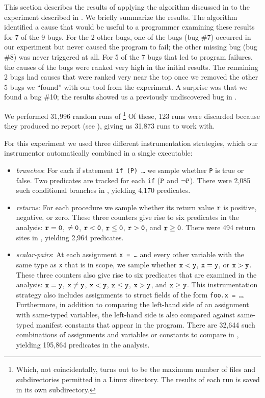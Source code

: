 
This section describes the results of applying the algorithm discussed
in  to the experiment described in
.  We briefly summarize the results.  
The algorithm identified a cause that would be useful to a programmer
examining these results for 7 of the 9 bugs.  For the 2 other bugs,
one of the bugs (bug \#7) occurred in our experiment but never caused
the program to fail; the other missing bug (bug \#8) was never
triggered at all.  For 5 of the 7 bugs that led to program failures,
the causes of the bugs were ranked very high in the initial results.  The
remaining 2 bugs had causes that were ranked very near the top once
we removed the other 5 bugs we ``found'' with our tool from the
experiment.  A surprise was that we found a bug \#10; the results
showed us a previously undiscovered bug in \moss.

We performed 31,996 random runs of
\moss\footnote{Which, not coincidentally, turns out to be the maximum
number of files and subdirectories permitted in a Linux directory.
The results of each run is saved in its own subdirectory.}  Of these,
123 runs were discarded because they produced no report (see ),
giving us 31,873 runs to work with.  

For this experiment we used three different instrumentation strategies, which our
instrumentor automatically combined in a single executable:
\begin{itemize}
\item {\em branches}: For each if statement {\tt if (P) \ldots} we sample whether {\tt P} is true or false.
Two predicates are tracked for each {\tt if} ($\tt P$ and $\tt \neg P$).  There were 2,085 such conditional branches
in \moss, yielding 4,170 predicates.

\item {\em returns}: For each procedure we sample whether its return value $\tt r$ is positive, negative, or zero.
These three counters give rise to six predicates in the analysis: $\tt r = 0$, $\tt \neq 0$, $\tt r < 0$, $\tt r \leq 0$, $\tt r > 0$, and $\tt r \geq 0$.
There were 494 return sites in \moss, yielding 2,964 predicates.

\item {\em scalar-pairs}: At each assignment {\tt x = \ldots} and every other variable with the same type as {\tt x} that is in scope,
we sample whether $\tt x < y$, $\tt x = y$, or $\tt x > y$.  These
three counters also give rise to six predicates that are examined in
the analysis: $\tt x = y$, $\tt x \neq y$, $\tt x < y$, $\tt x \leq
y$, $\tt x > y$, and $\tt x \geq y$.  This instrumentation strategy 
also includes assignments to struct fields of the form {\tt foo.x =
\ldots}.  Furthermore, in addition to comparing the left-hand side of
an assignment with same-typed variables, the left-hand side is also compared against
same-typed manifest constants that appear in the program.  There are
32,644 such combinations of assignments and variables or constants
to compare in \moss, yielding 195,864 predicates in the analysis.
\end{itemize}

